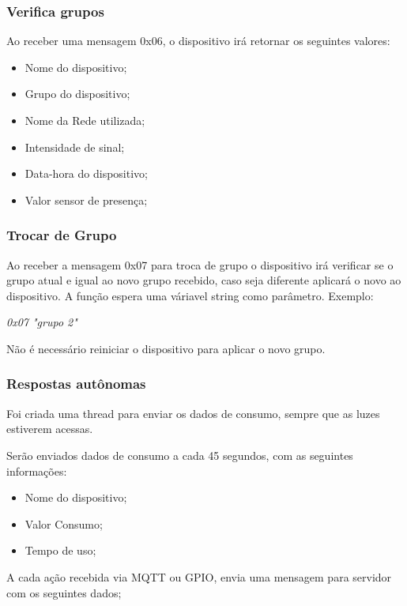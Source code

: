 \documentclass[openright]{normas-utf-tex} %
\begin{document}
\subsubsection{Verifica grupos}

Ao receber uma mensagem 0x06, o dispositivo irá retornar os seguintes valores:

\begin{itemize}
    \item Nome do dispositivo;
    \item Grupo do dispositivo;
    \item Nome da Rede utilizada;
    \item Intensidade de sinal;
    \item Data-hora do dispositivo;
    \item Valor sensor de presença;
\end{itemize}

\subsubsection{Trocar de Grupo}
Ao receber a mensagem 0x07 para troca de grupo o dispositivo irá verificar se o grupo atual e igual ao novo grupo recebido, caso seja diferente aplicará o novo ao dispositivo.
A função espera uma váriavel string\cite{Altabooks} como parâmetro.
Exemplo:
\begin{center}
    \textit{
    0x07 "grupo 2"
    }
\end{center}

Não é necessário reiniciar o dispositivo para aplicar o novo grupo.

\subsubsection{Respostas autônomas}

Foi criada uma thread para enviar os dados de consumo, sempre que as luzes estiverem acessas. 

Serão enviados dados de consumo a cada 45 segundos, com as seguintes informações:

\begin{itemize}
    \item Nome do dispositivo;
    \item Valor Consumo;
    \item Tempo de uso;
\end{itemize}

A cada ação recebida via MQTT ou GPIO,  envia uma mensagem para servidor com os seguintes dados;
\end{document}

